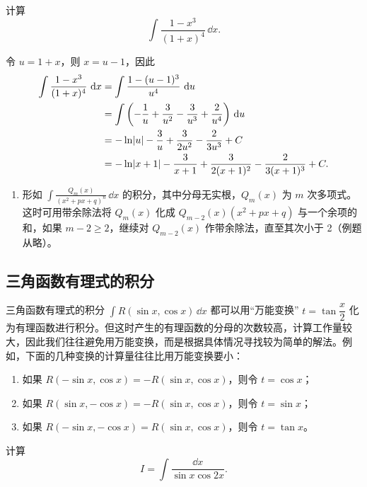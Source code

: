 \begin{xexample}[9.2.3]
计算
\[
  \int\frac{1-x^3}{(1+x)^4}\,\dd x.
\]
\end{xexample}

\begin{xsolution}
令 $u=1+x$，则 $x=u-1$，因此
\begin{align*}
  \int\frac{1-x^3}{(1+x)^4}\,\mathop{}\!\mathrm{d} x
  &=\int\frac{1-(u-1)^3}{u^4}\,\mathop{}\!\mathrm{d} u\\
  &=\int\left(-\frac1u+\frac3{u^2}-\frac3{u^3}+\frac2{u^4}\right)\,\mathop{}\!\mathrm{d} u\\
  &=-\ln\lvert u\rvert-\frac3u+\frac3{2u^2}-\frac2{3u^3}+C\\
  &=-\ln\lvert x+1\rvert-\frac3{x+1}+\frac3{2(x+1)^2}-\frac2{3(x+1)^3}+C.
\end{align*}
\end{xsolution}

\begin{enumerate}[resume]
  \item 形如 $\displaystyle\int\frac{Q_m(x)}{(x^2+px+q)^n}\,\dd x$ 的积分，其中分母无实根，$Q_m(x)$ 为 $m$ 次多项式。这时可用带余除法将 $Q_m(x)$ 化成 $Q_{m-2}(x)(x^2+px+q)$ 与一个余项的和，如果 $m-2\ge2$，继续对 $Q_{m-2}(x)$ 作带余除法，直至其次小于 2（例题从略）。
\end{enumerate}

\subsection{三角函数有理式的积分}

三角函数有理式的积分 $\int R(\sin x,\cos x)\,\dd x$ 都可以用“万能变换” $t=\tan\dfrac x2$ 化为有理函数进行积分。但这时产生的有理函数的分母的次数较高，计算工作量较大，因此我们往往避免用万能变换，而是根据具体情况寻找较为简单的解法。例如，下面的几种变换的计算量往往比用万能变换要小：

\begin{enumerate}
  \item 如果 $R(-\sin x,\cos x)=-R(\sin x,\cos x)$，则令 $t=\cos x$；
  \item 如果 $R(\sin x,-\cos x)=-R(\sin x,\cos x)$，则令 $t=\sin x$；
  \item 如果 $R(-\sin x,-\cos x)=R(\sin x,\cos x)$，则令 $t=\tan x$。
\end{enumerate}

\begin{xexample}[9.2.4]
计算
\[
  I=\int\frac{\dd x}{\sin x\cos2x}.
\]
\end{xexample}

